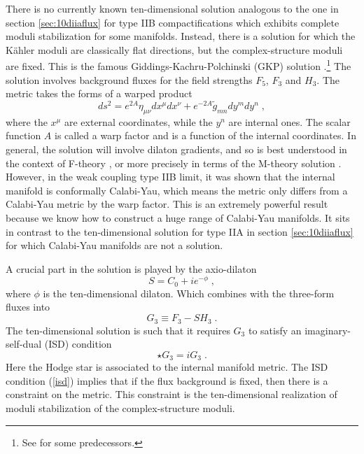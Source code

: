 \documentclass[11pt,a4paper]{article}
\numberwithin{equation}{section}
\numberwithin{table}{section}\setlength{\multlinegap}{25pt}
\newcommand{\be}{\begin{equation}}
\newcommand{\ee}{\end{equation}}
\begin{document}
There is no currently known ten-dimensional solution analogous to the one in section \ref{sec:10diiaflux} for type IIB compactifications which exhibits complete moduli stabilization for some manifolds. Instead, there is a solution for which the K{\"a}hler moduli are classically flat directions, but the complex-structure moduli are fixed. This is the famous Giddings-Kachru-Polchinski (GKP) solution \cite{Giddings:2001yu}.\footnote{See \cite{Taylor:1999ii,Dasgupta:1999ss,Curio:2000sc} for some predecessors.} The solution involves background fluxes for the field strengths $F_5$, $F_3$ and $H_3$. The metric takes the forms of a warped product
\be
ds^2 = e^{2A} \eta_{\mu\nu} dx^{\mu} dx^{\nu} + e^{-2A}\tilde{g}_{mn} dy^m dy^n \;,
\ee
where the $x^{\mu}$ are external coordinates, while the $y^n$ are internal ones. The scalar function $A$ is called a warp factor and is a function of the internal coordinates. In general, the solution will involve dilaton gradients, and so is best understood in the context of F-theory \cite{Vafa:1996xn}, or more precisely in terms of the M-theory solution \cite{Becker:1996gj}. However, in the weak coupling type IIB limit, it was shown that the internal manifold is conformally Calabi-Yau, which means the metric only differs from a Calabi-Yau metric by the warp factor. This is an extremely powerful result because we know how to construct a huge range of Calabi-Yau manifolds. It sits in contrast to the ten-dimensional solution for type IIA in section \ref{sec:10diiaflux} for which Calabi-Yau manifolds are not a solution. 

A crucial part in the solution is played by the axio-dilaton 
\be
S = C_0 + i e^{-\phi} \;,
\ee
where $\phi$ is the ten-dimensional dilaton. Which combines with the three-form fluxes into 
\be
G_3 \equiv F_3 - S H_3 \;.
\ee
The ten-dimensional solution is such that it requires $G_3$ to satisfy an imaginary-self-dual (ISD) condition
\be
\label{isd}
\star G_3 = i G_3 \;. 
\ee
Here the Hodge star is associated to the internal manifold metric. The ISD condition (\ref{isd}) implies that if the flux background is fixed, then there is a constraint on the metric. This constraint is the ten-dimensional realization of moduli stabilization of the complex-structure moduli. 
\end{document}
